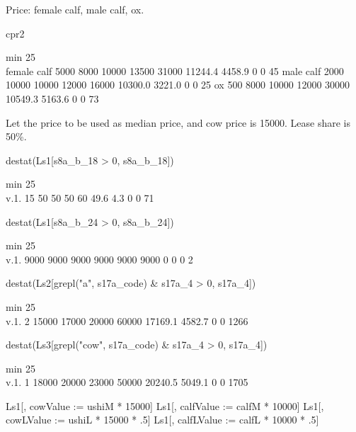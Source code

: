 Price: female calf, male calf, ox.
\begin{Schunk}
\begin{Sinput}
cpr2
\end{Sinput}
\begin{Soutput}
             min 25\\% median 75\\%   max    mean    std 0s NAs  n
female calf 5000  8000  10000 13500 31000 11244.4 4458.9  0   0 45
male calf   2000 10000  10000 12000 16000 10300.0 3221.0  0   0 25
ox           500  8000  10000 12000 30000 10549.3 5163.6  0   0 73
\end{Soutput}
\end{Schunk}
Let the price to be used as median price, and cow price is 15000. Lease share is 50\%.
\begin{Schunk}
\begin{Sinput}
destat(Ls1[s8a_b_18 > 0, s8a_b_18])
\end{Sinput}
\begin{Soutput}
     min 25\\% median 75\\% max mean std 0s NAs  n
v.1.  15    50     50    50  60 49.6 4.3  0   0 71
\end{Soutput}
\begin{Sinput}
destat(Ls1[s8a_b_24 > 0, s8a_b_24])
\end{Sinput}
\begin{Soutput}
      min 25\\% median 75\\%  max mean std 0s NAs n
v.1. 9000  9000   9000  9000 9000 9000   0  0   0 2
\end{Soutput}
\begin{Sinput}
destat(Ls2[grepl("a", s17a_code) & s17a_4 > 0, s17a_4])
\end{Sinput}
\begin{Soutput}
     min 25\\% median 75\\%   max    mean    std 0s NAs    n
v.1.   2 15000  17000 20000 60000 17169.1 4582.7  0   0 1266
\end{Soutput}
\begin{Sinput}
destat(Ls3[grepl("cow", s17a_code) & s17a_4 > 0, s17a_4])
\end{Sinput}
\begin{Soutput}
     min 25\\% median 75\\%   max    mean    std 0s NAs    n
v.1.   1 18000  20000 23000 50000 20240.5 5049.1  0   0 1705
\end{Soutput}
\begin{Sinput}
Ls1[, cowValue := ushiM * 15000]
Ls1[, calfValue := calfM * 10000]
Ls1[, cowLValue := ushiL * 15000 * .5]
Ls1[, calfLValue := calfL * 10000 * .5]
\end{Sinput}
\end{Schunk}
